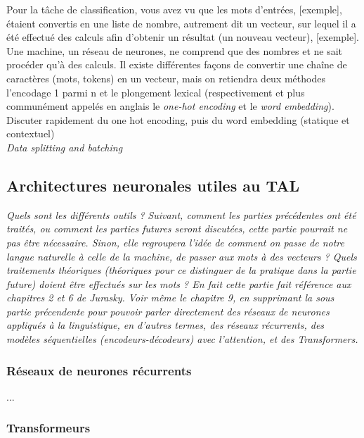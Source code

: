 \documentclass[12pt, french]{report}
\begin{document}
Pour la tâche de classification, vous avez vu que les mots d'entrées, [exemple], étaient convertis en une liste de nombre, autrement dit un vecteur, sur lequel il a été effectué des calculs afin d'obtenir un résultat (un nouveau vecteur), [exemple]. Une machine, un réseau de neurones, ne comprend que des nombres et ne sait procéder qu'à des calculs. Il existe différentes façons de convertir une chaîne de caractères (mots, tokens) en un vecteur, mais on retiendra deux méthodes l'encodage 1 parmi n et le plongement lexical (respectivement et plus communément appelés en anglais le \textit{one-hot encoding} et le \textit{word embedding}).\\

Discuter rapidement du one hot encoding, puis du word embedding (statique et contextuel)\\
    
\textit{Data splitting and batching}


\subsection{Architectures neuronales utiles au TAL}
\textit{Quels sont les différents outils ?}
\textit{Suivant, comment les parties précédentes ont été traités, ou comment les parties futures seront discutées, cette partie pourrait ne pas être nécessaire. Sinon, elle regroupera l'idée de comment on passe de notre langue naturelle à celle de la machine, de passer aux mots à des vecteurs ? Quels traitements théoriques (théoriques pour ce distinguer de la pratique dans la partie future) doient être effectués sur les mots ? En fait cette partie fait référence aux chapitres 2 et 6 de Jurasky. Voir même le chapitre 9, en supprimant la sous partie précendente pour pouvoir parler directement des réseaux de neurones appliqués à la linguistique, en d'autres termes, des réseaux récurrents, des modèles séquentielles (encodeurs-décodeurs) avec l'attention, et des Transformers.}\\

\subsubsection{Réseaux de neurones récurrents}

...

\subsubsection{Transformeurs}
\end{document}
